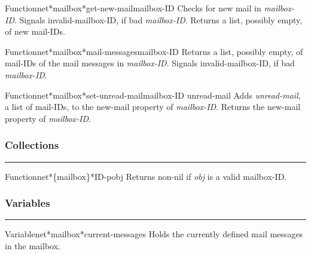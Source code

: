 \begin{functiondoc}{Function}{net*mailbox*get-new-mail}{mailbox-ID}
Checks for new mail in {\em mailbox-ID}.
Signals invalid-mailbox-ID, if bad {\em mailbox-ID}.
Returns a list, possibly empty, of new mail-IDs.
\end{functiondoc}

\begin{functiondoc}{Function}{net*mailbox*mail-messages}{mailbox-ID}
Returns a list, possibly empty, of mail-IDs of the mail 
messages in {\em mailbox-ID}.
Signals invalid-mailbox-ID, if bad {\em mailbox-ID}.
\end{functiondoc}

\begin{functiondoc}{Function}{net*mailbox*set-unread-mail}{mailbox-ID unread-mail}
Adds {\em unread-mail}, a list of mail-IDs, to the new-mail property of {\em mailbox-ID}.
Returns the new-mail property of {\em mailbox-ID}.
\end{functiondoc}


\subsubsection*{Collections}
\par\vspace*{0.00in}\par\hrule\par\medskip\par


\begin{functiondoc}{Function}{net*\{mailbox\}*ID-p}{obj}
Returns non-nil if {\em obj} is a valid mailbox-ID.
\end{functiondoc}


\subsubsection*{Variables}
\par\vspace*{0.00in}\par\hrule\par\medskip\par


\begin{functiondoc}{Variable}{net*mailbox*current-messages}{}
Holds the currently defined mail messages in the mailbox.
\end{functiondoc}


